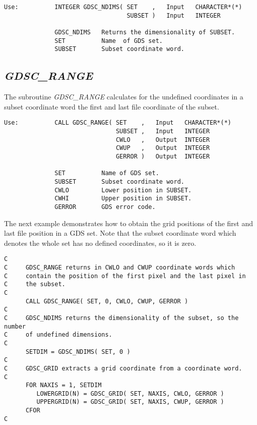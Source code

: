 \begin{verbatim}
Use:          INTEGER GDSC_NDIMS( SET    ,   Input   CHARACTER*(*)
                                  SUBSET )   Input   INTEGER

              GDSC_NDIMS   Returns the dimensionality of SUBSET.
              SET          Name  of GDS set.
              SUBSET       Subset coordinate word.
\end{verbatim}

\subsection{\sl GDSC\_RANGE\/}

The subroutine {\sl GDSC\_RANGE\/} calculates for the undefined
coordinates in a subset coordinate word the first and last file
coordinate of the subset.

\begin{verbatim}
Use:          CALL GDSC_RANGE( SET    ,   Input   CHARACTER*(*)
                               SUBSET ,   Input   INTEGER
                               CWLO   ,   Output  INTEGER
                               CWUP   ,   Output  INTEGER
                               GERROR )   Output  INTEGER

              SET          Name of GDS set.
              SUBSET       Subset coordinate word.
              CWLO         Lower position in SUBSET.
              CWHI         Upper position in SUBSET.
              GERROR       GDS error code.
\end{verbatim}

The next example demonstrates how to obtain the grid positions of the
first and last file position in a GDS set.  Note that the subset
coordinate word which denotes the whole set has no defined coordinates,
so it is zero.

\begin{verbatim}
C
C     GDSC_RANGE returns in CWLO and CWUP coordinate words which
C     contain the position of the first pixel and the last pixel in
C     the subset.
C
      CALL GDSC_RANGE( SET, 0, CWLO, CWUP, GERROR )
C
C     GDSC_NDIMS returns the dimensionality of the subset, so the number
C     of undefined dimensions.
C
      SETDIM = GDSC_NDIMS( SET, 0 )
C
C     GDSC_GRID extracts a grid coordinate from a coordinate word.
C
      FOR NAXIS = 1, SETDIM
         LOWERGRID(N) = GDSC_GRID( SET, NAXIS, CWLO, GERROR )
         UPPERGRID(N) = GDSC_GRID( SET, NAXIS, CWUP, GERROR )
      CFOR
C
\end{verbatim}

